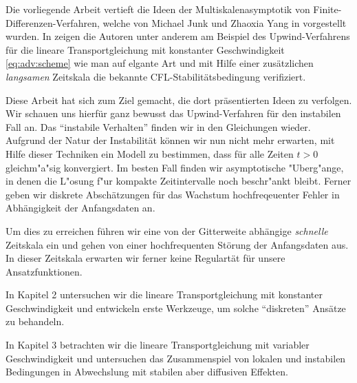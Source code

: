 
Die vorliegende Arbeit vertieft die Ideen der Multiskalenasymptotik von Finite-Dif\-fe\-ren\-zen-Verfahren, welche von Michael Junk und Zhaoxia Yang in \cite{Junk2004} vorgestellt wurden. 
In \cite{Junk2004} zeigen die Autoren unter anderem am Beispiel des Upwind-Ver\-fahrens für die lineare Transportgleichung mit konstanter Geschwindigkeit \eqref{eq:adv:scheme} wie man auf elgante Art und mit Hilfe einer zusätzlichen \emph{langsamen} Zeitskala die bekannte CFL-Sta\-bi\-li\-täts\-bedingung verifiziert.

Diese Arbeit hat sich zum Ziel gemacht, die dort präsentierten Ideen zu verfolgen.
Wir schauen uns hierfür ganz bewusst das Upwind-Verfahren für den instabilen Fall an.
Das ``instabile Verhalten'' finden wir in den Gleichungen wieder.
Aufgrund der Natur der Instabilität können wir nun nicht mehr erwarten, mit Hilfe dieser Techniken ein Modell zu bestimmen, dass für alle Zeiten $t > 0$ gleichm"a"sig konvergiert.
Im besten Fall finden wir asymptotische "Uberg"ange, in denen die L"osung f"ur kompakte Zeitintervalle noch beschr"ankt bleibt.
Ferner geben wir diskrete Abschätzungen für das Wachstum hochfreqeuenter Fehler in Abhängigkeit der Anfangsdaten an.

Um dies zu erreichen führen wir eine von der Gitterweite abhängige \emph{schnelle} Zeitskala ein und gehen von einer hochfrequenten Störung der Anfangsdaten aus.
In dieser Zeitskala erwarten wir ferner keine Regulartät für unsere Ansatzfunktionen.

In Kapitel 2 untersuchen wir die lineare Transportgleichung mit konstanter Geschwindigkeit und entwickeln erste Werkzeuge, um solche ``diskreten'' Ansätze zu behandeln.

In Kapitel 3 betrachten wir die lineare Transportgleichung mit variabler Geschwindigkeit und untersuchen das Zusammenspiel von lokalen und instabilen Bedingungen in Abwechslung mit stabilen aber diffusiven Effekten.